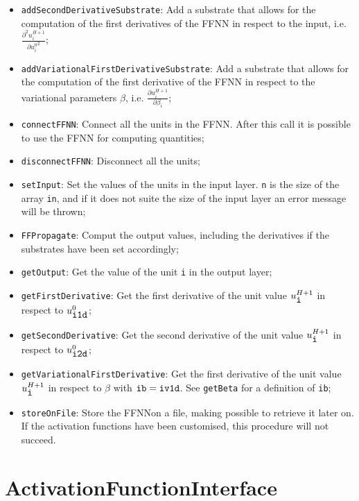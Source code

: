 \documentclass[11pt,a4paper,twoside]{article}
\begin{document}
\begin{itemize}
   \item \verb+addSecondDerivativeSubstrate+: Add a substrate that allows for the computation of the first derivatives of the FFNN in respect to the input, i.e. $\frac{\partial^2 u^{H+1}_i}{\partial {u^0_i}^2}$;
   \item \verb+addVariationalFirstDerivativeSubstrate+: Add a substrate that allows for the computation of the first derivative of the FFNN in respect to the variational parameters $\beta$, i.e. $\frac{\partial u^{H+1}_i}{\partial \beta_{i}}$;
   \item \verb+connectFFNN+: Connect all the units in the FFNN. After this call it is possible to use the FFNN for computing quantities;
   \item \verb+disconnectFFNN+: Disconnect all the units;
   \item \verb+setInput+: Set the values of the units in the input layer. \verb+n+ is the size of the array \verb+in+, and if it does not suite the size of the input layer an error message will be thrown;
   \item \verb+FFPropagate+: Comput the output values, including the derivatives if the substrates have been set accordingly;
   \item \verb+getOutput+: Get the value of the unit \verb+i+ in the output layer;
   \item \verb+getFirstDerivative+: Get the first derivative of the unit value $u^{H+1}_{\verb+i+}$ in respect to $u^0_{\verb+i1d+}$;
   \item \verb+getSecondDerivative+: Get the second derivative of the unit value $u^{H+1}_{\verb+i+}$ in respect to $u^0_{\verb+i2d+}$;
   \item \verb+getVariationalFirstDerivative+: Get the first derivative of the unit value $u^{H+1}_{\verb+i+}$ in respect to $\beta$ with $\verb+ib+ = \verb+iv1d+$. See \verb+getBeta+ for a definition of \verb+ib+;
   \item \verb+storeOnFile+: Store the FFNNon a file, making possible to retrieve it later on. If the activation functions have been customised, this procedure will not succeed.
\end{itemize}




\section{ActivationFunctionInterface} %
\label{sec:activationfunctioninterface}
\end{document}
